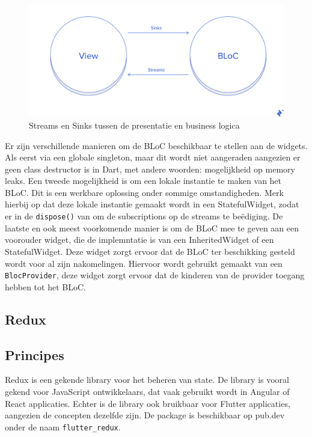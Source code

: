 \begin{figure}[H]
    \centering
    \includegraphics[width=\figureWidthModifier\linewidth]{img/stand-van-zaken/bloc-pattern-streams-sinks.png}
    \caption{Streams en Sinks tussen de presentatie en business logica \autocite{Perutovic2018}}
    \label{fig:bloc-pattern-streams-sinks}
\end{figure}

Er zijn verschillende manieren om de BLoC beschikbaar te stellen aan de widgets. Als eerst via een globale singleton, maar dit wordt niet aangeraden aangezien er geen class destructor is in Dart, met andere woorden: mogelijkheid op memory leaks.
Een tweede mogelijkheid is om een lokale instantie te maken van het BLoC. Dit is een werkbare oplossing onder sommige omstandigheden. Merk hierbij op dat deze lokale instantie gemaakt wordt in een StatefulWidget, zodat er in de \verb|dispose()| van om de subscriptions op de streams te beëdiging.
De laatste en ook meest voorkomende manier is om de BLoC mee te geven aan een voorouder widget, die de implemntatie is van een InheritedWidget of een StatefulWidget.  Deze widget zorgt ervoor dat de BLoC ter beschikking gesteld wordt voor al zijn nakomelingen. Hiervoor wordt gebruikt gemaakt van een \verb|BlocProvider|, deze widget zorgt ervoor dat de kinderen van de provider toegang hebben tot het BLoC.

\subsection{Redux}
\subsection*{Principes}
Redux is een gekende library voor het beheren van state. De library is vooral gekend voor JavaScript ontwikkelaars, dat vaak gebruikt wordt in Angular of React applicaties. Echter is de library ook bruikbaar voor Flutter applicaties, aangezien de concepten dezelfde zijn. De package is beschikbaar op pub.dev onder de naam \verb|flutter_redux|.


